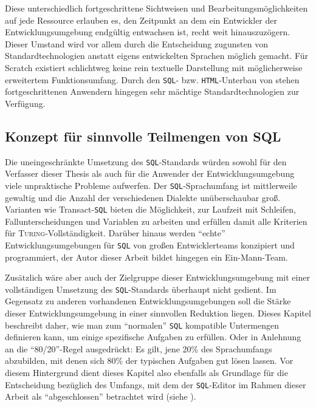 Diese unterschiedlich fortgeschrittene Sichtweisen und Bearbeitungsmöglichkeiten auf jede Ressource erlauben es, den Zeitpunkt an dem ein Entwickler der Entwicklungsumgebung endgültig entwachsen ist, recht weit hinauszuzögern. Dieser Umstand wird vor allem durch die Entscheidung zugunsten von Standardtechnologien anstatt eigens entwickelten Sprachen möglich gemacht. Für Scratch existiert schlichtweg keine rein textuelle Darstellung mit möglicherweise erweitertem Funktionsumfang. Durch den \texttt{SQL}- bzw. \texttt{HTML}-Unterbau von \idename{} stehen fortgeschrittenen Anwendern hingegen sehr mächtige Standardtechnologien zur Verfügung.

\subsection{Konzept für sinnvolle Teilmengen von SQL}
\label{sec:sql-subset}

Die uneingeschränkte Umsetzung des \texttt{SQL}-Standards würden sowohl für den Verfasser dieser Thesis als auch für die Anwender der Entwicklungsumgebung viele unpraktische Probleme aufwerfen. Der \texttt{SQL}-Sprachumfang ist mittlerweile gewaltig und die Anzahl der verschiedenen Dialekte unüberschaubar groß. Varianten wie Transact-\texttt{SQL} bieten die Möglichkeit, zur Laufzeit mit Schleifen, Fallunterscheidungen und Variablen zu arbeiten und erfüllen damit alle Kriterien für \textsc{Turing}-Vollständigkeit. Darüber hinaus werden ``echte'' Entwicklungsumgebungen für \texttt{SQL} von großen Entwicklerteams konzipiert und programmiert, der Autor dieser Arbeit bildet hingegen ein Ein-Mann-Team.


Zusätzlich wäre aber auch der Zielgruppe dieser Entwicklungsumgebung mit einer vollständigen Umsetzung des \texttt{SQL}-Standards überhaupt nicht gedient. Im Gegensatz zu anderen vorhandenen Entwicklungsumgebungen soll die Stärke dieser Entwicklungsumgebung in einer sinnvollen Reduktion liegen. Dieses Kapitel beschreibt daher, wie man zum "`normalen"' \texttt{SQL} kompatible Untermengen definieren kann, um einige spezifische Aufgaben zu erfüllen. Oder in Anlehnung an die "`80/20"'-Regel ausgedrückt: Es gilt, jene 20\% des Sprachumfangs abzubilden, mit denen sich 80\% der typischen Aufgaben gut lösen lassen. Vor diesem Hintergrund dient dieses Kapitel also ebenfalls als Grundlage für die Entscheidung bezüglich des Umfangs, mit dem der \texttt{SQL}-Editor im Rahmen dieser Arbeit als "`abgeschlossen"' betrachtet wird (siehe ).

